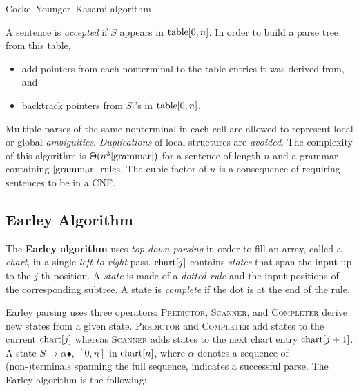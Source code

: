 \begin{algorithm}[H]
	\DontPrintSemicolon
	\SetAlgoLined
	\caption{Cocke--Younger--Kasami algorithm}
\end{algorithm}
A sentence is \emph{accepted} if \(S\) appears in \(\textnormal{table}[0, n]\).
In order to build a parse tree from this table,
\begin{itemize}
	\item add pointers from each nonterminal to the table entries it was derived from, and
	\item backtrack pointers from \(S_i\)'s in \(\textnormal{table}[0, n]\).
\end{itemize}
Multiple parses of the same nonterminal in each cell are allowed to represent local or global \emph{ambiguities}.
\emph{Duplications} of local structures are \emph{avoided}.
The complexity of this algorithm is \(\Theta(n^3 {\left\lvert\textnormal{grammar}\right\lvert})\) for a sentence of length \(n\) and a grammar containing \({\left\lvert\textnormal{grammar}\right\lvert}\) rules.
The cubic factor of \(n\) is a consequence of requiring sentences to be in a CNF.

\subsection{Earley Algorithm}
The \textbf{Earley algorithm} uses \emph{top-down parsing} in order to fill an array, called a \emph{chart}, in a single \emph{left-to-right} pass.
\(\textnormal{chart}[j]\) contains \emph{states} that span the input up to the \(j\)-th position.
A \emph{state} is made of a \emph{dotted rule} and the input positions of the corresponding subtree.
A state is \emph{complete} if the dot is at the end of the rule.

Earley parsing uses three operators: \textsc{Predictor}, \textsc{Scanner}, and \textsc{Completer} derive new states from a given state.
\textsc{Predictor} and \textsc{Completer} add states to the current \(\textnormal{chart}[j]\) whereas \textsc{Scanner} adds states to the next chart entry \(\textnormal{chart}[j+1]\).
A state \(S \to \alpha\bullet,\ [0, n]\) in \(\textnormal{chart}[n]\), where \(\alpha\) denotes a sequence of (non-)terminals spanning the full sequence, indicates a successful parse.
The Earley algorithm is the following:

